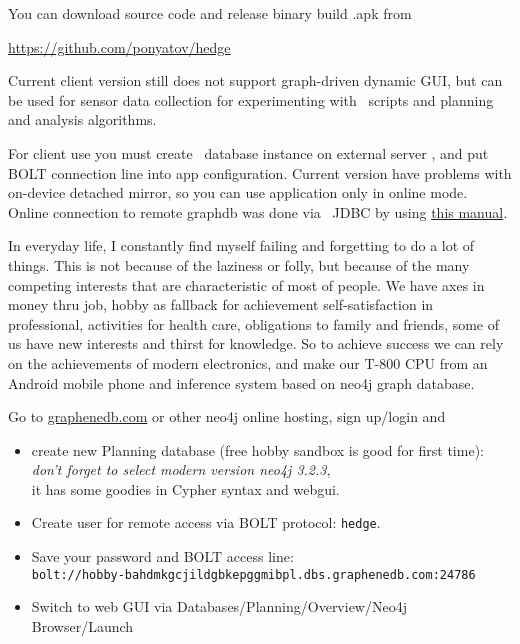 \secdown


You can download source code and release binary build .apk from

\bigskip
\url{https://github.com/ponyatov/hedge}
\bigskip

\clearpage

Current client version still does not support graph-driven dynamic GUI, but can
be used for sensor data collection for experimenting with \neo\ scripts and
planning and analysis algorithms.

For client use you must create \neo\ database instance on external server
, and put BOLT connection line into app configuration. Current version
have problems with on-device detached mirror,
so you can use application only in online mode. Online connection to remote
graphdb was done via \neo\ JDBC by using
\href{https://github.com/neo4j-contrib/neo4j-jdbc#minimum-viable-snippet}{this
manual}.


In everyday life, I constantly find myself failing and forgetting to do a lot of
things. This is not because of the laziness or folly, but because of the many
competing interests that are characteristic of most of people. We have axes in
money thru job, hobby as fallback for achievement self-satisfaction in
professional, activities for health care, obligations to family and friends,
some of us have new interests and thirst for knowledge. So to achieve success we
can rely on the achievements of modern electronics, and make our T-800 CPU from
an Android mobile phone and inference system based on neo4j graph database.

\bigskip
Go to \href{https://www.graphenedb.com/}{graphenedb.com} or other neo4j online
hosting, sign up/login and 
\begin{itemize}[nosep,leftmargin=*]
  \item 
create new Planning database (free hobby sandbox is good for first time):\\
\emph{don't forget to select modern version neo4j 3.2.3},\\
it has some goodies in Cypher syntax and webgui.
  \item 
Create user for remote access via BOLT protocol: \verb|hedge|.
  \item 
Save your password and BOLT access line:\\ 
\verb|bolt://hobby-bahdmkgcjildgbkepggmibpl.dbs.graphenedb.com:24786|
  \item 
Switch to web GUI via Databases/Planning/Overview/Neo4j Browser/Launch
\end{itemize}
\bigskip

